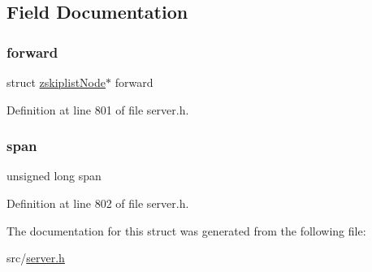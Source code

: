 \subsection{Field Documentation}
\mbox{\label{structzskiplist_node_1_1zskiplist_level_aaa7319c399716d20dfa04890a648f04a}} 
\subsubsection{\texorpdfstring{forward}{forward}}
{\footnotesize\ttfamily struct \hyperlink{structzskiplist_node}{zskiplist\+Node}$\ast$ forward}



Definition at line 801 of file server.\+h.

\mbox{\label{structzskiplist_node_1_1zskiplist_level_aa64c686737f5669a58d0d14c82d6d123}} 
\subsubsection{\texorpdfstring{span}{span}}
{\footnotesize\ttfamily unsigned long span}



Definition at line 802 of file server.\+h.



The documentation for this struct was generated from the following file\+:\begin{DoxyCompactItemize}
\item 
src/\hyperlink{server_8h}{server.\+h}\end{DoxyCompactItemize}
